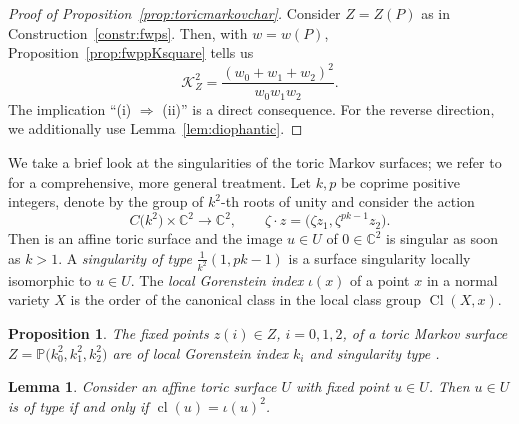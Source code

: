 \documentclass[10pt,a4paper]{amsart}
\newtheorem{lem}[thm]{Lemma}
\newtheorem{prop}[thm]{Proposition}
\theoremstyle{definition}
\def\CC{{\mathbb C}}
\def\PP{{\mathbb P}}
\DeclareMathOperator{\Cl}{Cl}
\DeclareMathOperator{\cl}{cl}
\begin{document}
\begin{proof}[Proof of Proposition~\ref{prop:toricmarkovchar}]
Consider $Z = Z(P)$ as in Construction~\ref{constr:fwps}.
Then, with $w=w(P)$, Proposition~\ref{prop:fwppKsquare}
tells us
\[
\mathcal{K}_Z^2
 =
\frac{(w_0+w_1+w_2)^2}{w_0w_1w_2}.
\]
The implication ``(i) $\Rightarrow$ (ii)''
is a direct consequence.
For the reverse direction, we additionally
use Lemma~\ref{lem:diophantic}.
\end{proof}

We take a brief look at the singularities of
the toric Markov surfaces; we refer
to~\cite[Sections~2 and~4]{HaPro} for a
comprehensive, more general treatment.
Let $k,p$ be coprime positive integers, denote
by \smash{$C\bigl(k^2\bigr) \subseteq \CC^*$} the group of $k^2$-th
roots of unity and consider the action
\[
C\bigl(k^2\bigr) \times \CC^2 \to \CC^2,
\qquad
\zeta \cdot z = \bigl(\zeta z_1, \zeta^{pk-1} z_2\bigr).
\]
Then \smash{$U := \CC^2/C\bigl(k^2\bigr)$} is an affine toric surface
and the image $u \in U$ of $0 \in \CC^2$ is singular
as soon as $k>1$.
A \emph{singularity of type} $\frac{1}{k^2}(1,pk-1)$
is a surface singularity locally isomorphic to $u \in U$.
The \emph{local Gorenstein index} $\iota(x)$ of a point
$x$ in a normal variety $X$ is the order of the canonical
class in the local class group $\Cl(X,x)$.


\begin{prop}
\label{prop:tmssingularities}
The fixed points $z(i) \in Z$, $i = 0,1,2$, of a toric
Markov surface $Z = \PP\bigl(k_0^2,k_1^2,k_2^2\bigr)$ are of
local Gorenstein index $k_i$ and singularity type
.
\end{prop}


\begin{lem}
\label{label:tsing}
Consider an affine toric surface $U$ with fixed
point $u \in U$.
Then $u \in U$ is of type 
if and only if $\cl(u) = \iota(u)^2$.
\end{lem}
\end{document}
